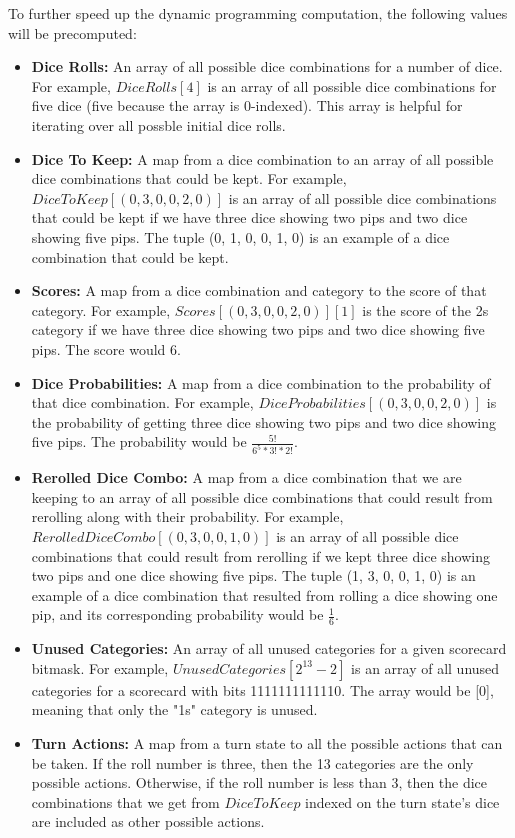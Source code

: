 \documentclass[12pt]{article}
\begin{document}
To further speed up the dynamic programming computation, the following values will be precomputed:

\begin{itemize}
    \item \textbf{Dice Rolls:} An array of all possible dice combinations for a number of dice. For example, $DiceRolls[4]$ is an array of all possible dice combinations for five dice (five because the array is 0-indexed). This array is helpful for iterating over all possble initial dice rolls.
    \item \textbf{Dice To Keep:} A map from a dice combination to an array of all possible dice combinations that could be kept. For example, $DiceToKeep[(0, 3, 0, 0, 2, 0)]$ is an array of all possible dice combinations that could be kept if we have three dice showing two pips and two dice showing five pips. The tuple (0, 1, 0, 0, 1, 0) is an example of a dice combination that could be kept.
    \item \textbf{Scores:} A map from a dice combination and category to the score of that category. For example, $Scores[(0, 3, 0, 0, 2, 0)][1]$ is the score of the 2s category if we have three dice showing two pips and two dice showing five pips. The score would 6.
    \item \textbf{Dice Probabilities:} A map from a dice combination to the probability of that dice combination. For example, $DiceProbabilities[(0, 3, 0, 0, 2, 0)]$ is the probability of getting three dice showing two pips and two dice showing five pips. The probability would be $\frac{5!}{6^{5} * 3! * 2!}$.
    \item \textbf{Rerolled Dice Combo:} A map from a dice combination that we are keeping to an array of all possible dice combinations that could result from rerolling along with their probability. For example, $RerolledDiceCombo[(0, 3, 0, 0, 1, 0)]$ is an array of all possible dice combinations that could result from rerolling if we kept three dice showing two pips and one dice showing five pips. The tuple (1, 3, 0, 0, 1, 0) is an example of a dice combination that resulted from rolling a dice showing one pip, and its corresponding probability would be $\frac{1}{6}$.
    \item \textbf{Unused Categories:} An array of all unused categories for a given scorecard bitmask. For example, $UnusedCategories[2^13 - 2]$ is an array of all unused categories for a scorecard with bits 1111111111110. The array would be [0], meaning that only the "1s" category is unused.
    \item \textbf{Turn Actions:} A map from a turn state to all the possible actions that can be taken. If the roll number is three, then the 13 categories are the only possible actions. Otherwise, if the roll number is less than 3, then the dice combinations that we get from $DiceToKeep$ indexed on the turn state's dice are included as other possible actions.
\end{itemize}
\end{document}
